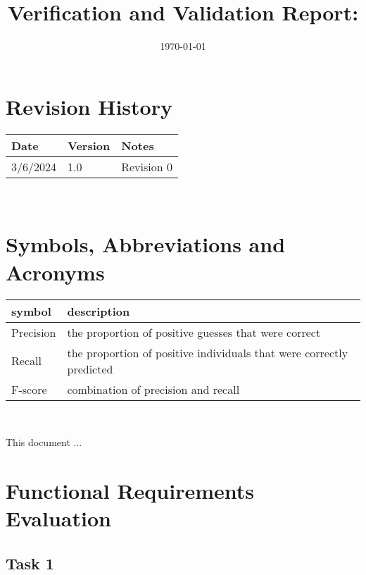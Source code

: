 \documentclass[12pt, titlepage]{article}
\begin{document}
\title{Verification and Validation Report: \progname} 
\author{\authname}
\date{\today}
	
\maketitle


\section{Revision History}

\begin{tabularx}{\textwidth}{p{3cm}p{2cm}X}
\toprule {\bf Date} & {\bf Version} & {\bf Notes}\\
\midrule
3/6/2024 & 1.0 & Revision 0\\
\bottomrule
\end{tabularx}

~\newpage

\section{Symbols, Abbreviations and Acronyms}

\renewcommand{\arraystretch}{1.2}
\begin{tabular}{l l} 
  \toprule		
  \textbf{symbol} & \textbf{description}\\
  \midrule 
  Precision & the proportion of positive guesses that were correct\\
  Recall & the proportion of positive individuals that were correctly predicted\\
  F-score & combination of precision and recall\\
  \bottomrule
\end{tabular}\\

\newpage

\tableofcontents

\listoftables %

\listoffigures %

\newpage


This document ...

\section{Functional Requirements Evaluation}
\subsection{Task 1}
\end{document}
